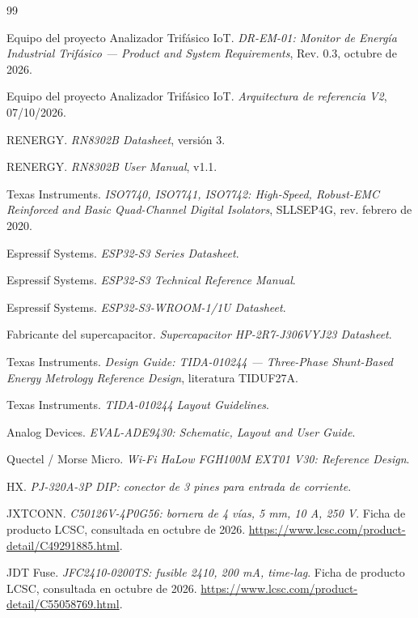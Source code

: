 \documentclass[11pt,a4paper]{article}
\begin{document}
\begin{thebibliography}{99}

Equipo del proyecto Analizador Trifásico IoT.
\textit{DR-EM-01: Monitor de Energía Industrial Trifásico --- Product and System
Requirements}, Rev. 0.3, octubre de 2026.

Equipo del proyecto Analizador Trifásico IoT.
\textit{Arquitectura de referencia V2}, 07/10/2026.

RENERGY.
\textit{RN8302B Datasheet}, versión 3.

RENERGY.
\textit{RN8302B User Manual}, v1.1.

Texas Instruments.
\textit{ISO7740, ISO7741, ISO7742: High-Speed, Robust-EMC Reinforced and Basic
Quad-Channel Digital Isolators}, SLLSEP4G, rev. febrero de 2020.

Espressif Systems.
\textit{ESP32-S3 Series Datasheet}.

Espressif Systems.
\textit{ESP32-S3 Technical Reference Manual}.

Espressif Systems.
\textit{ESP32-S3-WROOM-1/1U Datasheet}.

Fabricante del supercapacitor.
\textit{Supercapacitor HP-2R7-J306VYJ23 Datasheet}.

Texas Instruments.
\textit{Design Guide: TIDA-010244 --- Three-Phase Shunt-Based Energy Metrology
Reference Design}, literatura TIDUF27A.

Texas Instruments.
\textit{TIDA-010244 Layout Guidelines}.

Analog Devices.
\textit{EVAL-ADE9430: Schematic, Layout and User Guide}.

Quectel / Morse Micro.
\textit{Wi-Fi HaLow FGH100M EXT01 V30: Reference Design}.

HX.
\textit{PJ-320A-3P DIP: conector de 3 pines para entrada de corriente}.

JXTCONN.
\textit{C50126V-4P0G56: bornera de 4 vías, 5 mm, 10 A, 250 V}.
Ficha de producto LCSC, consultada en octubre de 2026.
\url{https://www.lcsc.com/product-detail/C49291885.html}.

JDT Fuse.
\textit{JFC2410-0200TS: fusible 2410, 200 mA, time-lag}.
Ficha de producto LCSC, consultada en octubre de 2026.
\url{https://www.lcsc.com/product-detail/C55058769.html}.


\end{thebibliography}
\end{document}
